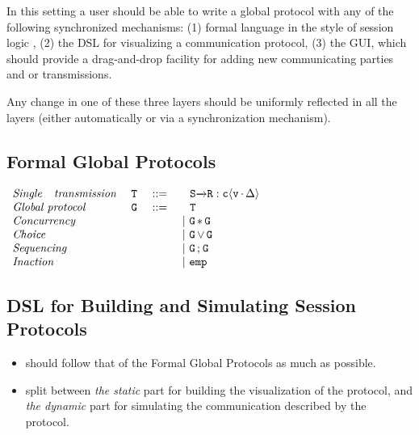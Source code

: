 \documentclass[acmsmall,10pt,review,anonymous]{acmart}\settopmatter{printfolios=true}
\begin{document}
In this setting a user should be able to write a global protocol with
any of the following synchronized mechanisms:
(1) formal language in the style of session logic \cite{Andreea2017thesis},
(2) the DSL for visualizing a communication protocol,
(3) the GUI, which should provide a drag-and-drop facility for adding new
communicating parties and or transmissions.

Any change in one of these three layers should be uniformly reflected in
all the layers (either automatically or via a synchronization mechanism).

\subsection{Formal Global Protocols}
\begin{center}
$
\begin{array}{llll}
  \textit{Single ~ transmission}~ & \code{\terminal}& {~ ::=}& \quad \code{\atransmit{S}{R}{v\,{\cdot}\,\fmsg}{\chanvar}{}}\\
  \textit{Global~protocol}& \code{\prot%
  } &{~ ::=} &\code{~~~ \terminal}\\
  \textit{Concurrency} &&& ~|~ \code{\prot\,{\useq}\,\prot} \\
  \textit{Choice} &&& ~|~ \code{\prot\,{\vee}\,\prot } \\
  \textit{Sequencing}
  &&& ~|~ \code{\prot\,{\gseq{}}\,\prot} \\
  \textit{Inaction} &&&   ~|~ {\emp}
\end{array}
$
\end{center}


\subsection{DSL for Building and Simulating Session Protocols}

\begin{itemize}
  \item should follow that of the Formal Global Protocols as much as
    possible.
  \item split between {\it the static} part for building the visualization
    of the protocol, and {\it the dynamic} part for simulating the
    communication described by the protocol.
\end{itemize}
\end{document}
